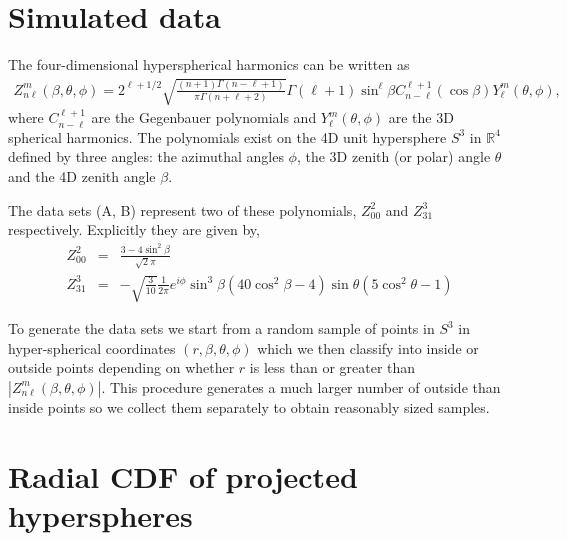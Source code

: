 \appendix

\section{Simulated data}

The  four-dimensional hyperspherical harmonics \cite{Domokos:1967fgx} can be written as
\begin{eqnarray}
Z^m_{n\ell}(\beta,\theta,\phi)=2^{\ell+1/2}\sqrt{\frac{(n+1)\Gamma(n-\ell+1)}{\pi\Gamma(n+\ell+2)}}
\Gamma(\ell+1)\sin^\ell\beta C^{\ell+1}_{n-\ell}(\cos\beta)Y^m_\ell(\theta,\phi),
\end{eqnarray}
where $C^{\ell+1}_{n-\ell}$ are the Gegenbauer polynomials and $Y^m_\ell(\theta,\phi)$ are the 3D spherical harmonics. The polynomials exist on the 4D unit hypersphere $S^3$ in $\mathbb{R}^4$ defined by three angles: the azimuthal angles $\phi$, the 3D zenith (or polar) angle $\theta$ and the 4D zenith angle $\beta$.

The data sets (A, B) represent two of these polynomials, $Z^2_{00}$ and $Z^3_{31}$ respectively. Explicitly they are given by,
\begin{eqnarray}
Z^2_{00} &=& \frac{3-4\sin^2\beta}{\sqrt{2}\pi} \nonumber \\
Z^3_{31} &=& -\sqrt{\frac{3}{10}}\frac{1}{2\pi} e^{i\phi}\sin^3\beta\left(40\cos^2\beta-4\right)\sin\theta\left(5\cos^2\theta-1\right)
\end{eqnarray}

To generate the data sets we start from a random sample of points in $S^3$ in hyper-spherical coordinates $(r,\beta,\theta,\phi)$ which we then classify into inside or outside points depending on whether $r$ is less than or greater than $|Z^m_{n\ell}(\beta,\theta,\phi)|$. This procedure generates a much larger number of outside than inside points so we collect them separately to obtain reasonably sized samples.



\section{Radial CDF of projected hyperspheres}

